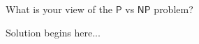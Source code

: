 \documentclass{article}
\begin{document}
\begin{question}
What is your view of the $\mathsf P$ vs $\mathsf{NP}$ problem?
\end{question}

\begin{solution}
Solution begins here...
\end{solution}
\end{document}

